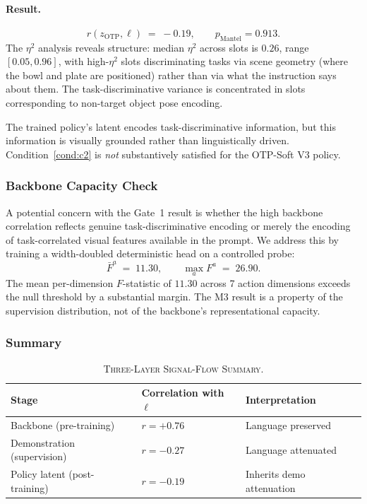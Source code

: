 \paragraph{Result.}
\begin{equation}
r(z_{\text{OTP}}, \ell) \;=\; -0.19, \qquad p_{\text{Mantel}} = 0.913.
\label{eq:c1_result}
\end{equation}
The $\eta^2$ analysis reveals structure: median $\eta^2$ across slots is $0.26$, range
$[0.05, 0.96]$, with high-$\eta^2$ slots discriminating tasks via scene geometry (where
the bowl and plate are positioned) rather than via what the instruction says about them.
The task-discriminative variance is concentrated in slots corresponding to non-target
object pose encoding.

The trained policy's latent encodes task-discriminative information, but this information
is visually grounded rather than linguistically driven. Condition~\ref{cond:c2} is
\emph{not} substantively satisfied for the OTP-Soft V3 policy.

\subsubsection{Backbone Capacity Check}
\label{sec:results:diagnostic:capacity}

A potential concern with the Gate~1 result is whether the high backbone correlation
reflects genuine task-discriminative encoding or merely the encoding of task-correlated
visual features available in the prompt. We address this by training a width-doubled
deterministic head on a controlled probe:
\begin{equation}
\bar{F}^a \;=\; 11.30, \qquad \max_a F^a \;=\; 26.90.
\label{eq:test4_result}
\end{equation}
The mean per-dimension $F$-statistic of $11.30$ across 7 action dimensions exceeds the
null threshold by a substantial margin. The M3 result is a property of the supervision
distribution, not of the backbone's representational capacity.

\subsubsection{Summary}
\label{sec:results:diagnostic:summary}

\begin{table}[t]
\centering
\caption{\textsc{Three-Layer Signal-Flow Summary.}}
\label{tab:diagnostic_summary}
\small
\begin{tabular}{lll}
\toprule
\textbf{Stage} & \textbf{Correlation with $\ell$} & \textbf{Interpretation} \\
\midrule
Backbone (pre-training)        & $r = +0.76$  & Language preserved \\
Demonstration (supervision)    & $r = -0.27$  & Language attenuated \\
Policy latent (post-training)  & $r = -0.19$  & Inherits demo attenuation \\
\bottomrule
\end{tabular}
\end{table}

